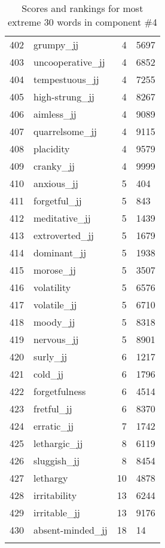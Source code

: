 \begin{longtable}[!htbp]{| rlr@{.}l |}
    402 & grumpy\_jj & 4 & 5697 \\
    403 & uncooperative\_jj & 4 & 6852 \\
    404 & tempestuous\_jj & 4 & 7255 \\
    405 & high-strung\_jj & 4 & 8267 \\
    406 & aimless\_jj & 4 & 9089 \\
    407 & quarrelsome\_jj & 4 & 9115 \\
    408 & placidity & 4 & 9579 \\
    409 & cranky\_jj & 4 & 9999 \\
    410 & anxious\_jj & 5 & 404 \\
    411 & forgetful\_jj & 5 & 843 \\
    412 & meditative\_jj & 5 & 1439 \\
    413 & extroverted\_jj & 5 & 1679 \\
    414 & dominant\_jj & 5 & 1938 \\
    415 & morose\_jj & 5 & 3507 \\
    416 & volatility & 5 & 6576 \\
    417 & volatile\_jj & 5 & 6710 \\
    418 & moody\_jj & 5 & 8318 \\
    419 & nervous\_jj & 5 & 8901 \\
    420 & surly\_jj & 6 & 1217 \\
    421 & cold\_jj & 6 & 1796 \\
    422 & forgetfulness & 6 & 4514 \\
    423 & fretful\_jj & 6 & 8370 \\
    424 & erratic\_jj & 7 & 1742 \\
    425 & lethargic\_jj & 8 & 6119 \\
    426 & sluggish\_jj & 8 & 8454 \\
    427 & lethargy & 10 & 4878 \\
    428 & irritability & 13 & 6244 \\
    429 & irritable\_jj & 13 & 9176 \\
    430 & absent-minded\_jj & 18 & 14 \\
    \hline
    \caption{Scores and rankings for most extreme 30 words in component \#4} \\
\end{longtable}
